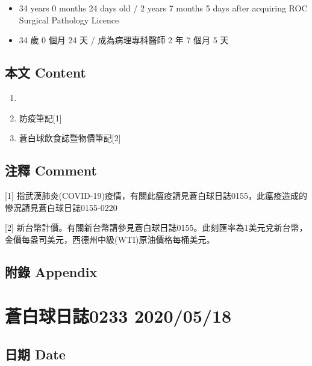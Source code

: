 \documentclass[
]{article}
\providecommand{\tightlist}{%
  \setlength{\itemsep}{0pt}\setlength{\parskip}{0pt}}
\begin{document}
\begin{itemize}
\tightlist
\item
  34 years 0 months 24 days old / 2 years 7 months 5 days after
  acquiring ROC Surgical Pathology Licence
\item
  34 歲 0 個月 24 天 / 成為病理專科醫師 2 年 7 個月 5 天
\end{itemize}

\hypertarget{ux672cux6587-content-16}{%
\subsection{本文 Content}\label{ux672cux6587-content-16}}

\begin{enumerate}
\def\labelenumi{\arabic{enumi}.}
\item
\item
  防疫筆記{[}1{]}
\item
  蒼白球飲食誌暨物價筆記{[}2{]}
\end{enumerate}

\hypertarget{ux6ce8ux91cb-comment-16}{%
\subsection{注釋 Comment}\label{ux6ce8ux91cb-comment-16}}

{[}1{]}
指武漢肺炎(COVID-19)疫情，有關此瘟疫請見蒼白球日誌0155，此瘟疫造成的慘況請見蒼白球日誌0155-0220

{[}2{]}
新台幣計價。有關新台幣請參見蒼白球日誌0155。此刻匯率為1美元兌新台幣，金價每盎司美元，西德州中級(WTI)原油價格每桶美元。

\hypertarget{ux9644ux9304-appendix-16}{%
\subsection{附錄 Appendix}\label{ux9644ux9304-appendix-16}}

\hypertarget{ux84bcux767dux7403ux65e5ux8a8c0233-20200518}{%
\section{蒼白球日誌0233
2020/05/18}\label{ux84bcux767dux7403ux65e5ux8a8c0233-20200518}}

\hypertarget{ux65e5ux671f-date-17}{%
\subsection{日期 Date}\label{ux65e5ux671f-date-17}}
\end{document}
